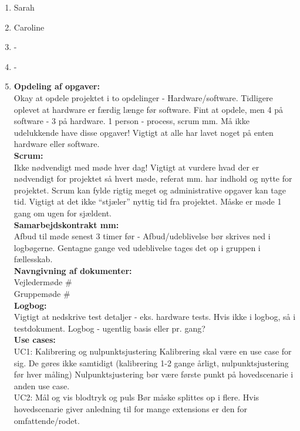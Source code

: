 \begin{enumerate}
	\item Sarah
	\item Caroline
	\item -
	\item -
	\item \textbf{Opdeling af opgaver:} \\ Okay at opdele projektet i to opdelinger - Hardware/software. Tidligere oplevet at hardware er færdig længe før software. Fint at opdele, men 4 på software - 3 på hardware.
	1 person - process, scrum mm. Må ikke udelukkende have disse opgaver! Vigtigt at alle har lavet noget på enten hardware eller software. \\
	
	\textbf{Scrum:} \\ Ikke nødvendigt med møde hver dag! Vigtigt at vurdere hvad der er nødvendigt for projektet så hvert møde, referat mm. har indhold og nytte for projektet. Scrum kan fylde rigtig meget og administrative opgaver kan tage tid. Vigtigt at det ikke “stjæler” nyttig tid fra projektet. Måske er møde 1 gang om ugen for sjældent.\\
	
	\textbf{Samarbejdskontrakt mm:} \\ Afbud til møde senest 3 timer før - Afbud/udeblivelse bør skrives ned i logbøgerne.
	Gentagne gange ved udeblivelse tages det op i gruppen i fællesskab.\\
	
	\textbf{Navngivning af dokumenter:} \\
	Vejledermøde \# \\
	Gruppemøde \# \\
	
	\textbf{Logbog:} \\ Vigtigt at nedskrive test detaljer - eks. hardware tests. Hvis ikke i logbog, så i testdokument. Logbog - ugentlig basis eller pr. gang? \\
	
	\textbf{Use cases:} \\ UC1: Kalibrering og nulpunktsjustering
	Kalibrering skal være en use case for sig. De gøres ikke samtidigt (kalibrering 1-2 gange årligt, nulpunktsjustering før hver måling)
	Nulpunktsjustering bør være første punkt på hovedscenarie i anden use case. \\

	UC2: Mål og vis blodtryk og puls
	Bør måske splittes op i flere. Hvis hovedscenarie giver anledning til for mange extensions er den for omfattende/rodet.\\
	

\end{enumerate}
